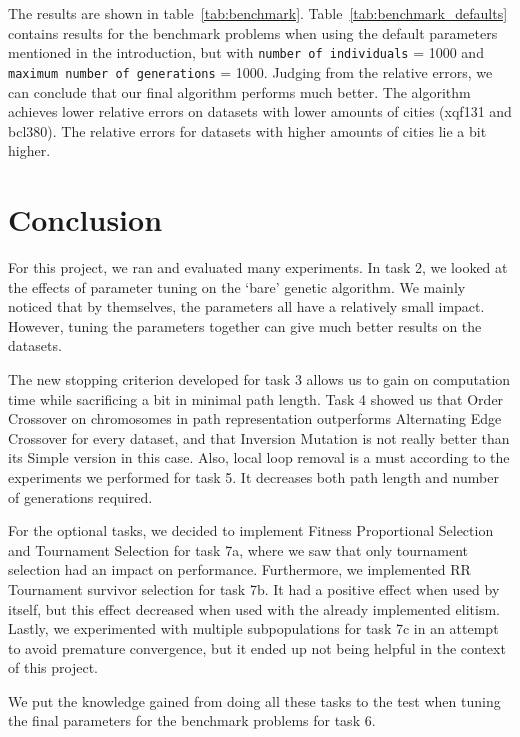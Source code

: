 \documentclass{report}
\begin{document}
The results are shown in table~\ref{tab:benchmark}. Table~\ref{tab:benchmark_defaults} contains results for the benchmark problems when using the default parameters mentioned in the introduction, but with \texttt{number of individuals} = 1000 and \texttt{maximum number of generations} = 1000. Judging from the relative errors, we can conclude that our final algorithm performs much better. The algorithm achieves lower relative errors on datasets with lower amounts of cities (xqf131 and bcl380). The relative errors for datasets with higher amounts of cities lie a bit higher.



\newpage
\section{Conclusion}

For this project, we ran and evaluated many experiments. In task 2, we looked at the effects of parameter tuning on the `bare' genetic algorithm. We mainly noticed that by themselves, the parameters all have a relatively small impact. However, tuning the parameters together can give much better results on the datasets.

The new stopping criterion developed for task 3 allows us to gain on computation time while sacrificing a bit in minimal path length. Task 4 showed us that Order Crossover on chromosomes in path representation outperforms Alternating Edge Crossover for every dataset, and that Inversion Mutation is not really better than its Simple version in this case. Also, local loop removal is a must according to the experiments we performed for task 5. It decreases both path length and number of generations required.

For the optional tasks, we decided to implement Fitness Proportional Selection and Tournament Selection for task 7a, where we saw that only tournament selection had an impact on performance. Furthermore, we implemented RR Tournament survivor selection for task 7b. It had a positive effect when used by itself, but this effect decreased when used with the already implemented elitism. Lastly, we experimented with multiple subpopulations for task 7c in an attempt to avoid premature convergence, but it ended up not being helpful in the context of this project.

We put the knowledge gained from doing all these tasks to the test when tuning the final parameters for the benchmark problems for task 6.
\end{document}
